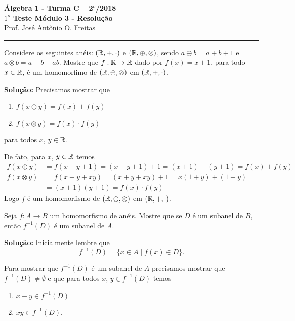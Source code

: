 \documentclass[12pt]{article}
\begin{document}


\begin{center}
{\Large\bf {\'A}lgebra 1 - Turma C -- 2$^{o}$/2018} \\ \vspace{9pt} {\large\bf
  $1^{\underline{o}}$ Teste Módulo 3 - Resolu\c{c}\~ao}\\
\vspace{9pt} Prof. Jos{\'e} Ant{\^o}nio O. Freitas
\end{center}
\hrule

\vspace{.6cm}

\questao Considere os seguintes an{\'e}is: $(\mathbb{R}, +, \cdot)$ e $(\mathbb{R}, \oplus, \otimes)$, sendo $a \oplus b = a + b + 1$ e $a \otimes b = a + b + ab$. Mostre que $f : \mathbb{R} \to \mathbb{R}$ dado por $f(x) = x + 1$, para todo $x \in \mathbb{R}$, {\'e} um homomorfimo de $(\mathbb{R}, \oplus, \otimes)$ em $(\mathbb{R}, +, \cdot)$.

\noindent\textbf{Solu\c{c}\~ao:}
Precisamos mostrar que
\begin{enumerate}[label=({\alph*})]
	\item $f(x \oplus y) = f(x) + f(y)$
	\item $f(x \otimes y) = f(x)\cdot f(y)$
\end{enumerate}
para todos $x$, $y \in \mathbb{R}$.

De fato, para $x$, $y \in \mathbb{R}$ temos
\begin{align*}
	f(x \oplus y) &= f(x + y + 1) = (x + y + 1) + 1 = (x + 1) + (y + 1) = f(x) + f(y)\\
	f(x \otimes y) &=  f(x + y + xy) = (x + y + xy) + 1 = x(1 + y) + (1 + y) \\ &= (x + 1)(y + 1) = f(x)\cdot f(y)
\end{align*}
Logo $f$ é um homomorfismo de $(\mathbb{R}, \oplus, \otimes)$ em $(\mathbb{R}, +, \cdot)$.

\vspace{.5cm}

\questao Seja $f: A \to B$ um homomorfismo de an{\'e}is. Mostre que se $D$ {\'e} um subanel de $B$, ent{\~a}o $f^{-1}(D)$ {\'e} um subanel de $A$.

\noindent\textbf{Solu\c{c}\~ao:} Inicialmente lembre que
\[
	f^{-1}(D) = \{x \in A \mid f(x) \in D\}.
\]

Para mostrar que $f^{-1}(D)$ é um subanel de $A$ precisamos mostrar que $f^{-1}(D) \ne \emptyset$ e que para todos $x$, $y \in f^{-1}(D)$ temos
\begin{enumerate}[label=({\alph*})]
	\item $x - y \in f^{-1}(D)$
	\item $xy \in f^{-1}(D)$.
\end{enumerate}
\end{document}
